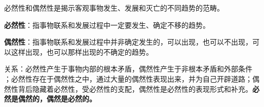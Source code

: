 必然性和偶然性是揭示客观事物发生、发展和灭亡的不同趋势的范畴。

{{\textbf{必然性}}：指事物联系和发展过程中一定要发生、确定不移的趋势。}

\textbf{{偶然性}}：指事物联系和发展过程中并非确定发生的，可以出现，也可以不出现，可以这样出现，也可以那样出现的不确定的趋势。

{{关系}：必然性产生于事物内部的根本矛盾，偶然性产生于非根本矛盾和外部条件}
；必然性存在于偶然性之中，通过大量的偶然性表现出来，并为自己开辟道路；偶然性背后隐藏着必然性，受必然性的支配，偶然\textbf{}性是必然性的表现形式和补充。\textbf{{{必然是偶然的，偶然是必然的}{。}}}
